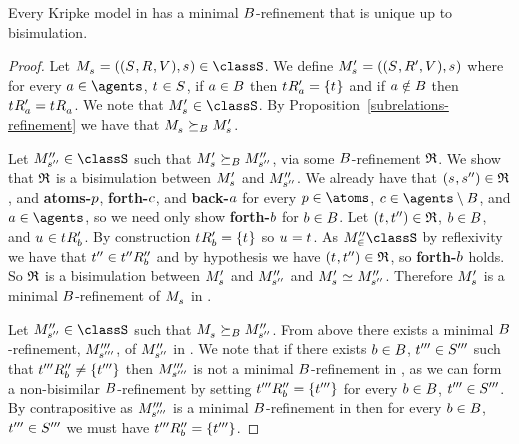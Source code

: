 \begin{proposition}\label{minimal-refinement-s4-s5}
Every Kripke model in \classS{} has a minimal $B$-refinement that is unique up to bisimulation.
\end{proposition}

\begin{proof}
Let $\kPModelAndTuple{\kStateS} \in \classS$.
We define $\kPModelP{\kStateS} = ((\kStates, \kAccessibilityP{}, \kValuation), \kStateS)$ where for every $\agentA \in \agents$, $\kStateT \in \kStates$, if $a \in B$ then $\kSuccessorsPA{\kStateT} = \{\kStateT\}$ and if $a \notin B$ then $\kSuccessorsPA{\kStateT} = \kSuccessorsA{\kStateT}$.
We note that $\kPModelP{\kStateS} \in \classS$.
By Proposition~\ref{subrelations-refinement} we have that $\kPModel{\kStateS} \simulatesBs \kPModelP{\kStateS}$.

Let $\kPModelPP{\kStateSPP} \in \classS$ such that $\kPModelP{\kStateS} \simulatesBs \kPModelPP{\kStateSPP}$, via some $B$-refinement $\mathfrak{R}$.
We show that $\mathfrak{R}$ is a bisimulation between $\kPModelP{\kStateS}$ and ${M^{\prime\prime}_{{s}^{\prime\prime}}}$.
We already have that $(\kStateS, \kStateSPP) \in \refinement$, and {\bf atoms-$p$}, {\bf forth-$c$}, and {\bf back-$a$} for every $\atomP \in \atoms$, $\agentC \in \agents \setminus \agentsB$, and $\agentA \in \agents$, so we need only show {\bf forth-$b$} for $b \in B$.
Let $(\kStateT, \kStateTPP) \in \refinement$, $b \in B$, and $\kStateU \in \kSuccessorsPB{\kStateT}$.
By construction $\kSuccessorsPB{\kStateT} = \{\kStateT\}$ so $\kStateU = \kStateT$.
As $\kPModelPP \in \classS$ by reflexivity we have that ${t}^{\prime\prime} \in {{t}^{\prime\prime}} {R^{\prime\prime}_{b}}$ and by hypothesis we have $(\kStateT, \kStateTPP) \in \refinement$, so {\bf forth-$b$} holds.
So $\mathfrak{R}$ is a bisimulation between $\kPModelP{\kStateS}$ and ${M^{\prime\prime}_{{s}^{\prime\prime}}}$ and $\kPModelP{\kStateS} \bisimilar \kPModelPP{\kStateSPP}$.
Therefore $\kPModelP{\kStateS}$ is a minimal $B$-refinement of $\kPModel{\kStateS}$ in \classS{}.

Let $\kPModelPP{\kStateSPP} \in \classS$ such that $\kPModel{\kStateS} \simulatesBs \kPModelPP{\kStateSPP}$.
From above there exists a minimal $B$-refinement, ${M^{\prime\prime\prime}_{{s}^{\prime\prime\prime}}}$, of ${M^{\prime\prime}_{{s}^{\prime\prime}}}$ in \classS{}.
We note that if there exists $b \in B$, ${t}^{\prime\prime\prime} \in {S^{\prime\prime\prime}}$ such that ${{t}^{\prime\prime\prime}} {R^{\prime\prime}_{b}} \neq \{{t}^{\prime\prime\prime}\}$ then ${M^{\prime\prime\prime}_{{s}^{\prime\prime\prime}}}$ is not a minimal $B$-refinement in \classS{}, as we can form a non-bisimilar $B$-refinement by setting ${{t}^{\prime\prime\prime}} {R^{\prime\prime}_{b}} = \{{t}^{\prime\prime\prime}\}$ for every $b \in B$, ${t}^{\prime\prime\prime} \in {S^{\prime\prime\prime}}$.
By contrapositive as ${M^{\prime\prime\prime}_{{s}^{\prime\prime\prime}}}$ is a minimal $B$-refinement in \classS{} then for every $b \in B$, ${t}^{\prime\prime\prime} \in {S^{\prime\prime\prime}}$ we must have ${{t}^{\prime\prime\prime}} {R^{\prime\prime}_{b}} = \{{t}^{\prime\prime\prime}\}$.


\end{proof}
